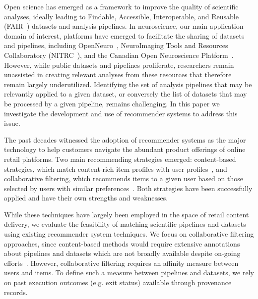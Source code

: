 \documentclass[conference]{IEEEtran}
\begin{document}
Open science has emerged as a framework to improve the quality of
scientific analyses, ideally leading to Findable, Accessible, Interoperable, and
Reusable (FAIR~\cite{wilkinson2016fair}) datasets and analysis pipelines. In
neuroscience, our main application domain of interest, platforms have
emerged to facilitate the sharing of datasets and pipelines, including
OpenNeuro~\cite{gorgolewski2017openneuro}, NeuroImaging Tools and Resources Collaboratory (NITRC~\cite{kennedy2016nitrc}), and the Canadian Open
Neuroscience Platform~\cite{conp}. However, while public
datasets and pipelines proliferate, researchers remain unassisted in
creating relevant analyses from these resources that therefore remain
largely underutilized. Identifying the set of analysis pipelines that may
be relevantly applied to a given dataset, or conversely the list of datasets that may be processed by
a given pipeline, remains challenging. In this paper we investigate
the development and use of recommender systems to address this issue.


The past decades witnessed the adoption of recommender systems as the major
 technology to help customers navigate the abundant product offerings of
 online retail platforms. Two main
 recommending strategies emerged: content-based strategies, which match content-rich item profiles with user profiles~\cite{pazzani2007content},
 and collaborative filtering, which recommends items to a given user based on those
 selected by users with similar preferences~\cite{rajaraman2011mining}.
 Both strategies have been successfully applied and have their own strengths and weaknesses.
 
 While these techniques have largely been employed in the space of retail
 content delivery, we evaluate the feasibility of matching scientific pipelines and datasets
 using existing recommender system techniques. We focus on collaborative
 filtering approaches, since content-based methods would require extensive
 annotations about pipelines and datasets which are not broadly available
 despite on-going
 efforts~\cite{NeuroimagingDataModel,sansone2017dats,DATSDocumentation}.
 However, collaborative filtering requires an affinity measure
 between users and items. To define such a measure between pipelines and
 datasets, we rely on past execution outcomes (e.g. exit status) available through provenance records.
\end{document}
